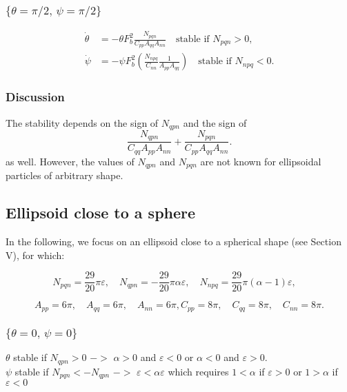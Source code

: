\documentclass[12pt]{My_preprint}
\begin{document}
\subsubsection{$\{\theta = \pi/2, \, \psi = \pi/2\}$}
\begin{align}
  \dot \theta  &=  -\theta F_b^2 \frac{N_{pqn}}{C_{pp}A_{qq} A_{nn}}\quad \text{stable if $N_{pqn}>0$}, \\
  \dot \psi   &= -\psi F_b^2 \left(\frac{N_{npq}}{C_{nn}}\frac{1}{A_{pp} A_{qq}}\right)\quad \text{stable if $N_{npq}<0$}.
\end{align}

\subsubsection{Discussion}

The stability depends on the sign of $N_{qpn}$ and the sign of 
\begin{equation}
\frac{N_{qpn}}{C_{qq} A_{pp} A_{nn}} + \frac{N_{pqn}}{C_{pp} A_{qq} A_{nn}} .
\end{equation}
as well.
However, the values of $N_{qpn}$ and $N_{pqn}$ are not known for ellipsoidal particles of arbitrary shape.

\subsection{Ellipsoid close to a sphere}

In the following, we focus on an ellipsoid close to a spherical shape (see Section V), for which:

$$
N_{pqn} = \frac{29}{20}\pi \varepsilon, \quad
N_{qpn} = -\frac{29}{20}\pi \alpha \varepsilon, \quad
N_{npq} = \frac{29}{20}\pi (\alpha - 1)\varepsilon, \quad $$

$$
A_{pp} = 6\pi, \quad A_{qq} = 6\pi,  \quad A_{nn} = 6\pi ,
C_{pp} = 8\pi, \quad C_{qq} = 8\pi,  \quad C_{nn} = 8\pi .
$$

\subsubsection{$\{\theta = 0, \, \psi = 0\}$}

$\theta$ stable if $N_{qpn}>0$ $->$ $\alpha >0$ and $\varepsilon < 0$ or  $\alpha <0$ and $\varepsilon > 0$.\\
$\psi$ stable if $N_{pqn} < -N_{qpn}$ $->$ $\varepsilon < \alpha \varepsilon$ which requires  $1<\alpha$ if  $\varepsilon > 0$ or $1 > \alpha$ if $\varepsilon < 0$
\end{document}
